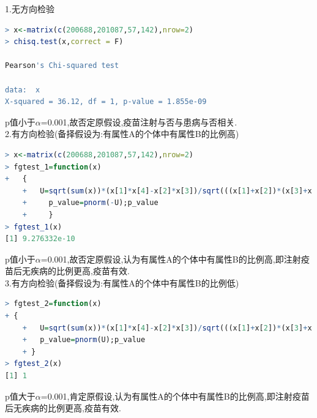 \documentclass[11pt,a4paper]{ctexart}
\begin{document}
1.无方向检验
\begin{lstlisting}[language=r]
> x<-matrix(c(200688,201087,57,142),nrow=2)
> chisq.test(x,correct = F)

Pearson's Chi-squared test

data:  x
X-squared = 36.12, df = 1, p-value = 1.855e-09
\end{lstlisting}
p值小于$ \alpha $=0.001,故否定原假设,疫苗注射与否与患病与否相关.\\

2.有方向检验(备择假设为:有属性A的个体中有属性B的比例高)
\begin{lstlisting}[language=r]
> x<-matrix(c(200688,201087,57,142),nrow=2)
> fgtest_1=function(x)
+   {
	+   U=sqrt(sum(x))*(x[1]*x[4]-x[2]*x[3])/sqrt(((x[1]+x[2])*(x[3]+x[4])*(x[1]+x[3])*(x[2]+x[4])))  #卡方统计量
	+     p_value=pnorm(-U);p_value
	+     }
> fgtest_1(x)
[1] 9.276332e-10
\end{lstlisting}
p值小于$ \alpha $=0.001,故否定原假设,认为有属性A的个体中有属性B的比例高,即注射疫苗后无疾病的比例更高,疫苗有效.\\


3.有方向检验(备择假设为:有属性A的个体中有属性B的比例低)
\begin{lstlisting}[language=r]
> fgtest_2=function(x)
+ {
	+   U=sqrt(sum(x))*(x[1]*x[4]-x[2]*x[3])/sqrt(((x[1]+x[2])*(x[3]+x[4])*(x[1]+x[3])*(x[2]+x[4]))) 
	+   p_value=pnorm(U);p_value
	+ }
> fgtest_2(x)
[1] 1
\end{lstlisting}
p值大于$ \alpha $=0.001,肯定原假设,认为有属性A的个体中有属性B的比例高,即注射疫苗后无疾病的比例更高,疫苗有效.
\end{document}
